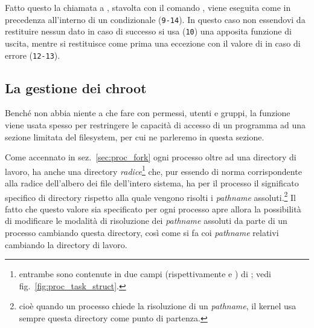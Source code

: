 Fatto questo la chiamata a , stavolta con il comando
, viene eseguita come in precedenza all'interno di un
condizionale (\texttt{\small 9-14}). In questo caso non essendovi da
restituire nessun dato in caso di successo si usa (\texttt{\small 10}) una
apposita funzione di uscita, mentre si restituisce come prima una eccezione
con il valore di  in caso di errore (\texttt{\small 12-13}).

\subsection{La gestione dei {chroot}}
\label{sec:file_chroot}




Benché non abbia niente a che fare con permessi, utenti e gruppi, la funzione
 viene usata spesso per restringere le capacità di accesso di un
programma ad una sezione limitata del filesystem, per cui ne parleremo in
questa sezione.

Come accennato in sez.~\ref{sec:proc_fork} ogni processo oltre ad una
directory di lavoro, ha anche una directory \textsl{radice}\footnote{entrambe
  sono contenute in due campi (rispettivamente  e ) di
  ; vedi fig.~\ref{fig:proc_task_struct}.} che, pur
essendo di norma corrispondente alla radice dell'albero dei file dell'intero
sistema, ha per il processo il significato specifico di directory rispetto
alla quale vengono risolti i \textit{pathname} assoluti.\footnote{cioè quando
  un processo chiede la risoluzione di un \textit{pathname}, il kernel usa
  sempre questa directory come punto di partenza.} Il fatto che questo valore
sia specificato per ogni processo apre allora la possibilità di modificare le
modalità di risoluzione dei \textit{pathname} assoluti da parte di un processo
cambiando questa directory, così come si fa coi \textit{pathname} relativi
cambiando la directory di lavoro.


